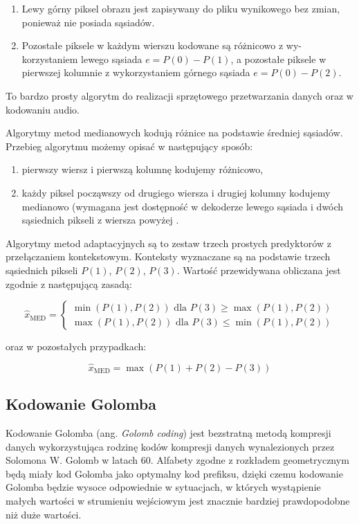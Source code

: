 \documentclass{article}
\begin{document}
\begin{enumerate}
 \item Lewy górny piksel obrazu jest zapisywany do pliku wynikowego bez zmian, ponieważ nie posiada sąsiadów.
 \item Pozostałe piksele w każdym wierszu kodowane są różnicowo z wy-korzystaniem lewego sąsiada $e = P(0) - P(1)$, a pozostałe piksele w pierwszej kolumnie z wykorzystaniem górnego sąsiada $e = P(0) - P(2)$.
\end{enumerate}
To bardzo prosty algorytm do realizacji sprzętowego przetwarzania danych oraz w kodowaniu audio.


Algorytmy metod medianowych kodują różnice na podstawie średniej sąsiadów. Przebieg algorytmu możemy opisać w następujący sposób:
\begin{enumerate}
 \item pierwszy wiersz i pierwszą kolumnę kodujemy różnicowo,
 \item każdy piksel począwszy od drugiego wiersza i drugiej kolumny kodujemy medianowo (wymagana jest dostępność w dekoderze lewego sąsiada i dwóch sąsiednich pikseli z wiersza powyżej \cite{differential_coding}.
\end{enumerate}


Algorytmy metod adaptacyjnych są to zestaw trzech prostych predyktorów z przełączaniem kontekstowym. Konteksty wyznaczane są na podstawie trzech sąsiednich pikseli $P(1)$, $P(2)$, $P(3)$. Wartość przewidywana obliczana jest zgodnie z następującą zasadą:


\begin{equation}
\hat{x}_{\mathrm{MED}}=\left\{\begin{array}{l}
\min (P(1), P(2)) \text{ dla } P(3) \geq \max(P(1), P(2)) \\
\max (P(1), P(2)) \text{ dla } P(3) \leq \min(P(1), P(2))
\end{array}\right.
\end{equation}

oraz w pozostałych przypadkach: 


\begin{equation}
\hat{x}_{\mathrm{MED}}= \max(P(1) + P(2) - P(3))
\end{equation}

\subsection{Kodowanie Golomba}

Kodowanie Golomba (ang. \emph{Golomb coding}) jest bezstratną metodą kompresji danych wykorzystująca rodzinę kodów kompresji danych wynalezionych przez Solomona W. Golomb w latach 60. Alfabety zgodne z rozkładem geometrycznym będą miały kod Golomba jako optymalny kod prefiksu, dzięki czemu kodowanie Golomba będzie wysoce odpowiednie w sytuacjach, w których wystąpienie małych wartości w strumieniu wejściowym jest znacznie bardziej prawdopodobne niż duże wartości.
\end{document}
